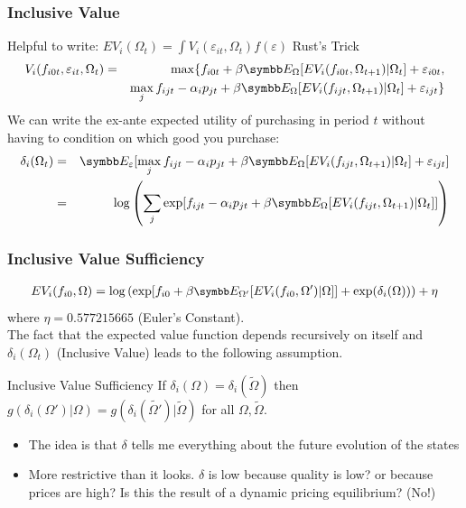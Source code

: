 \documentclass[aspectratio=169,11pt]{beamer}
\begin{document}
\begin{frame}
\frametitle{Inclusive Value}
 Helpful to write: $EV_i(\Omega_t)= \int V_i(\varepsilon_{it},  \Omega_t)f(\varepsilon)$ \alert{Rust's Trick}
\begin{eqnarray*}
V_i(f_{i0t},\varepsilon_{i t}, \Omega_t) &=& \max \{ f_{i0t} + \beta \E_{\Omega}[ EV_i (f_{i0t}, \Omega_{t+1}) |\Omega_{t} ] + \varepsilon_{i0t},\\
&& \max_j f_{ijt}  -\alpha_i p_{jt} + \beta \E_{\Omega}[ E V_i (f_{ijt}, \Omega_{t+1}) |\Omega_{t}] + \varepsilon_{ijt}  \}
\end{eqnarray*}
We can write the \alert{ex-ante} expected utility of purchasing in period $t$ without having to condition on which good you purchase:
\begin{eqnarray*} 
\delta_{i}(\Omega_t) &=& \E_{\varepsilon} [ \max_j f_{ijt}  -\alpha_i p_{jt} + \beta \E_{\Omega}[ E V_i (f_{ijt}, \Omega_{t+1}) |\Omega_{t}] + \varepsilon_{ijt}]  \\
&=& \log \left( \sum_j \exp[ f_{ijt}  -\alpha_i p_{jt} + \beta \E_{\Omega}[ E V_i (f_{ijt}, \Omega_{t+1}) |\Omega_{t}] ]  \right)
\end{eqnarray*}
\end{frame}

\begin{frame}
\frametitle{Inclusive Value Sufficiency}
\begin{eqnarray*}
\small EV_i(f_{i0}, \Omega) = \log\left( \exp[ f_{i0} + \beta \E_{\Omega'}[ EV_i (f_{i0}, \Omega') |\Omega]] + \exp(\delta_i(\Omega))  \right) + \eta
\end{eqnarray*}
\footnotesize 
\alert{where $\eta = 0.577215665$ (Euler's Constant).}\\
\normalsize
The fact that the expected value function depends recursively on itself and $\delta_{i}(\Omega_t)$ (Inclusive Value) leads to the following assumption.
\begin{block}{Inclusive Value Sufficiency}
If $\delta_i(\Omega) = \delta_i(\tilde{\Omega})$ then $g(\delta_i(\Omega') | \Omega)= g(\delta_i(\tilde{\Omega'}) | \tilde{\Omega})$ for all $\Omega,\tilde{\Omega}$.
\end{block}
\begin{itemize}
\item The idea is that $\delta$ tells me everything about the future evolution of the states
\item More restrictive than it looks.  $\delta$ is low because quality is low? or because prices are high? Is this the result of a dynamic pricing equilibrium? (No!)
\end{itemize}
\end{frame}
\end{document}
